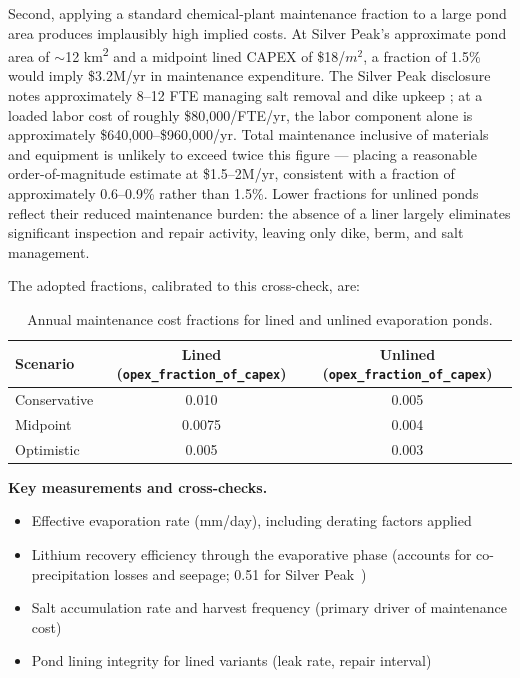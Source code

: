 Second, applying a standard chemical-plant maintenance fraction to a large pond area produces implausibly high implied costs. At Silver Peak's approximate pond area of $\sim$12 \si{km^2} and a midpoint lined CAPEX of \$18/$\si{m^2}$, a fraction of 1.5\% would imply \$3.2M/yr in maintenance expenditure. The Silver Peak disclosure notes approximately 8--12 FTE managing salt removal and dike upkeep \cite{srkconsultingSECTechnicalReport2023a}; at a loaded labor cost of roughly \$80,000/FTE/yr, the labor component alone is approximately \$640,000--\$960,000/yr. Total maintenance inclusive of materials and equipment is unlikely to exceed twice this figure --- placing a reasonable order-of-magnitude estimate at \$1.5--2M/yr, consistent with a fraction of approximately 0.6--0.9\% rather than 1.5\%. Lower fractions for unlined ponds reflect their reduced maintenance burden: the absence of a liner largely eliminates significant inspection and repair activity, leaving only dike, berm, and salt management.
 
The adopted fractions, calibrated to this cross-check, are:
 
\begin{table}[h!]
\caption{Annual maintenance cost fractions for lined and unlined evaporation ponds.}
\label{tab:c-maint-fractions-ponds}
\centering
\begin{tabular}{lcc}
\toprule
\textbf{Scenario} & \textbf{Lined (\texttt{opex\_fraction\_of\_capex})} & \textbf{Unlined (\texttt{opex\_fraction\_of\_capex})} \\
\midrule
Conservative & 0.010  & 0.005 \\
Midpoint     & 0.0075 & 0.004 \\
Optimistic   & 0.005  & 0.003 \\
\bottomrule
\end{tabular}
\end{table}
 
 
\medskip
\noindent\textbf{Key measurements and cross-checks.}\quad
\begin{itemize}[noitemsep]
  \item Effective evaporation rate (mm/day), including derating factors applied
  \item Lithium recovery efficiency through the evaporative phase (accounts for co-precipitation losses and seepage; 0.51 for Silver Peak~\cite{srkconsultingSECTechnicalReport2022})
  \item Salt accumulation rate and harvest frequency (primary driver of maintenance cost)
  \item Pond lining integrity for lined variants (leak rate, repair interval)
\end{itemize}
 
